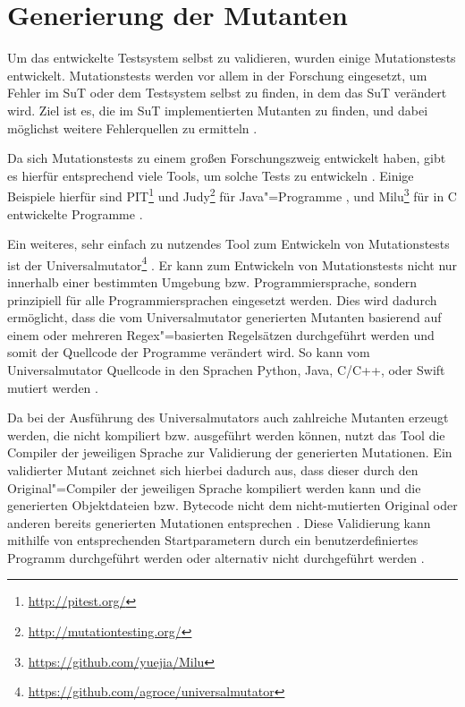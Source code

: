 \section{Generierung der Mutanten}
\label{sec:implMutationTests}

Um das entwickelte Testsystem selbst zu validieren, wurden einige Mutationstests entwickelt.
Mutationstests werden vor allem in der Forschung eingesetzt, um Fehler im \gls{SuT} oder dem Testsystem selbst zu finden, in dem das \gls{SuT} verändert wird.
Ziel ist es, die im \gls{SuT} implementierten Mutanten zu finden, und dabei möglichst weitere Fehlerquellen zu ermitteln \cite{DeMillo1978,Hamlet1977,Jia2011,Groce2018}.

Da sich Mutationstests zu einem großen Forschungszweig entwickelt haben, gibt es hierfür entsprechend viele Tools, um solche Tests zu entwickeln \cite{Jia2011,Groce2018}.
Einige Beispiele hierfür sind PIT\footnote{\url{http://pitest.org/}} und Judy\footnote{\url{http://mutationtesting.org/}} für Java"=Programme \cite{Coles2016,Madeyski2010}, und Milu\footnote{\url{https://github.com/yuejia/Milu}} für in C entwickelte Programme \cite{Jia2008}.

Ein weiteres, sehr einfach zu nutzendes Tool zum Entwickeln von Mutationstests ist der Universalmutator\footnote{\url{https://github.com/agroce/universalmutator}} \cite{Groce2018}.
Er kann zum Entwickeln von Mutationstests nicht nur innerhalb einer bestimmten Umgebung bzw. Programmiersprache, sondern prinzipiell für alle Programmiersprachen eingesetzt werden.
Dies wird dadurch ermöglicht, dass die vom Universalmutator generierten Mutanten basierend auf einem oder mehreren \gls{Regex}"=basierten Regelsätzen durchgeführt werden und somit der Quellcode der Programme verändert wird.
So kann vom Universalmutator Quellcode \uA in den Sprachen Python, Java, C/C++, oder Swift mutiert werden \cite{Groce2018}.

Da bei der Ausführung des Universalmutators auch zahlreiche Mutanten erzeugt werden, die nicht kompiliert bzw. ausgeführt werden können, nutzt das Tool die Compiler der jeweiligen Sprache zur Validierung der generierten Mutationen.
Ein validierter Mutant zeichnet sich hierbei dadurch aus, dass dieser durch den Original"=Compiler der jeweiligen Sprache kompiliert werden kann und die generierten Objektdateien bzw. Bytecode nicht dem nicht-mutierten Original oder anderen bereits generierten Mutationen entsprechen \cite{Groce2018}.
Diese Validierung kann mithilfe von entsprechenden Startparametern durch ein benutzerdefiniertes Programm durchgeführt werden oder alternativ nicht durchgeführt werden \cite{Groce2018,UniversalmutatorSourceGenmutants}.

